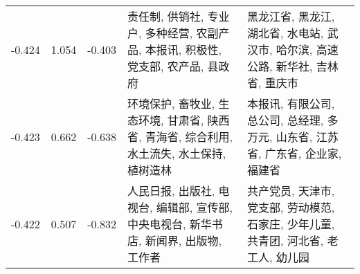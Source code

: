 \begin{tabular}{cccp{5cm}p{5cm}}
-0.424 & 1.054 & -0.403 & 责任制, 供销社, 专业户, 多种经营, 农副产品, 本报讯, 积极性, 党支部, 农产品, 县政府 & 黑龙江省, 黑龙江, 湖北省, 水电站, 武汉市, 哈尔滨, 高速公路, 新华社, 吉林省, 重庆市 \\
-0.423 & 0.662 & -0.638 & 环境保护, 畜牧业, 生态环境, 甘肃省, 陕西省, 青海省, 综合利用, 水土流失, 水土保持, 植树造林 & 本报讯, 有限公司, 总公司, 总经理, 多万元, 山东省, 江苏省, 广东省, 企业家, 福建省 \\
-0.422 & 0.507 & -0.832 & 人民日报, 出版社, 电视台, 编辑部, 宣传部, 中央电视台, 新华书店, 新闻界, 出版物, 工作者 & 共产党员, 天津市, 党支部, 劳动模范, 石家庄, 少年儿童, 共青团, 河北省, 老工人, 幼儿园 \\
\bottomrule
\end{tabular}
